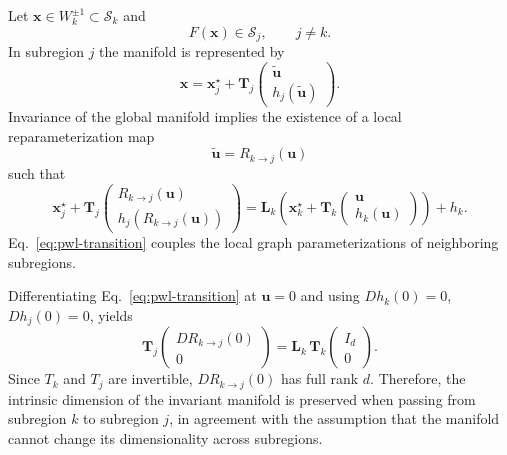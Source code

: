 \documentclass{article}
\theoremstyle{example}
\theoremstyle{plain}
\theoremstyle{definition}
\theoremstyle{remark}
\def\eqref#1{equation~\ref{#1}}
\def\vx{{\bm{x}}}
\def\mL{{\bm{L}}}
\def\mT{{\bm{T}}}
\renewcommand{\eqref}[1]{Eq.~\ref{#1}}
\begin{document}
Let $\vx\in W^{\pm1}_k\subset\mathcal S_k$ and 
\begin{equation}
F(\vx)\in\mathcal S_j , \qquad j\neq k .
\end{equation}
In subregion $j$ the manifold is represented by 
\begin{equation}
\vx = \vx_j^\star + \mT_j
\begin{pmatrix}
\bm{\tilde u} \\ h_j(\bm{\tilde u})
\end{pmatrix}.
\end{equation}
Invariance of the global manifold implies the existence of a local
reparameterization map 
\begin{equation}
\bm{\tilde u} = R_{k\to j}(\bm{u})
\end{equation}
such that 
\begin{equation}
\vx_j^\star
+
\mT_j
\begin{pmatrix}
R_{k\to j}(\bm{u}) \\
h_j(R_{k\to j}(\bm{u}))
\end{pmatrix}
=
\mL_k\!\left(
\vx_k^\star + \mT_k
\begin{pmatrix}
\bm{u} \\ h_k(\bm{u})
\end{pmatrix}
\right)
+
h_k .
\label{eq:pwl-transition}
\end{equation}
\eqref{eq:pwl-transition} couples the local graph parameterizations of neighboring subregions.%

Differentiating \eqref{eq:pwl-transition} at $\bm{u}=0$ and using $Dh_k(0)=0$, $Dh_j(0)=0$, yields 
\begin{equation}
\mT_j
\begin{pmatrix}
DR_{k\to j}(0) \\ 0
\end{pmatrix}
=
\mL_k\, \mT_k
\begin{pmatrix}
I_d \\ 0
\end{pmatrix}.
\label{eq:pwl-dimension}
\end{equation}
Since $T_k$ and $T_j$ are invertible, $DR_{k\to j}(0)$ has full rank $d$. Therefore, the intrinsic dimension of the invariant manifold is preserved when passing from subregion $k$ to subregion $j$, in agreement with the assumption that the manifold cannot change its dimensionality across subregions. 
\end{document}
